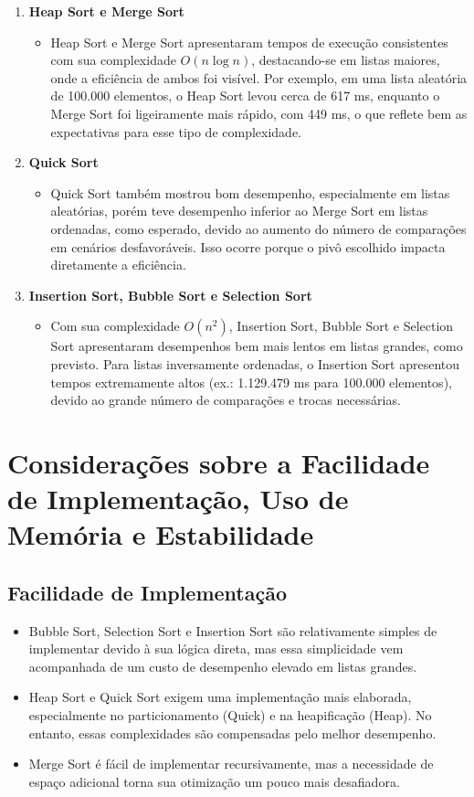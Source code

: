 \documentclass[12pt, a4paper]{report}
\begin{document}
\begin{enumerate}
    \item \textbf{Heap Sort e Merge Sort}
    \begin{itemize}
        \item Heap Sort e Merge Sort apresentaram tempos de execução consistentes com sua complexidade $O(n \log n)$, destacando-se em listas maiores, onde a eficiência de ambos foi visível. Por exemplo, em uma lista aleatória de 100.000 elementos, o Heap Sort levou cerca de 617 ms, enquanto o Merge Sort foi ligeiramente mais rápido, com 449 ms, o que reflete bem as expectativas para esse tipo de complexidade.
    \end{itemize}

    \item \textbf{Quick Sort}
    \begin{itemize}
        \item Quick Sort também mostrou bom desempenho, especialmente em listas aleatórias, porém teve desempenho inferior ao Merge Sort em listas ordenadas, como esperado, devido ao aumento do número de comparações em cenários desfavoráveis. Isso ocorre porque o pivô escolhido impacta diretamente a eficiência.
    \end{itemize}
    
    \item \textbf{Insertion Sort, Bubble Sort e Selection Sort}
    \begin{itemize}
        \item Com sua complexidade $O(n^2)$, Insertion Sort, Bubble Sort e Selection Sort apresentaram desempenhos bem mais lentos em listas grandes, como previsto. Para listas inversamente ordenadas, o Insertion Sort apresentou tempos extremamente altos (ex.: 1.129.479 ms para 100.000 elementos), devido ao grande número de comparações e trocas necessárias.
    \end{itemize}
    
\end{enumerate}
\section{Considerações sobre a Facilidade de Implementação, Uso de Memória e Estabilidade}

\subsection{Facilidade de Implementação}
\begin{itemize}
    \item Bubble Sort, Selection Sort e Insertion Sort são relativamente simples de implementar devido à sua lógica direta, mas essa simplicidade vem acompanhada de um custo de desempenho elevado em listas grandes.
    \item Heap Sort e Quick Sort exigem uma implementação mais elaborada, especialmente no particionamento (Quick) e na heapificação (Heap). No entanto, essas complexidades são compensadas pelo melhor desempenho.
    \item Merge Sort é fácil de implementar recursivamente, mas a necessidade de espaço adicional torna sua otimização um pouco mais desafiadora.
\end{itemize}
\end{document}
